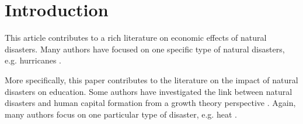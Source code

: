 
\section{Introduction}

This article contributes to a rich literature on economic effects of natural disasters. Many authors have focused on one specific type of natural disasters, e.g. hurricanes \citep{Deryugina_2017, Deryugina_2018}. 

More specifically, this paper contributes to the literature on the impact of natural disasters on education. Some authors have investigated the link between natural disasters and human capital formation from a growth theory perspective \citep{Skidmore_2002, Cuaresma_2010}. Again, many authors focus on one particular type of disaster, e.g. heat \citep{Park_2020}.